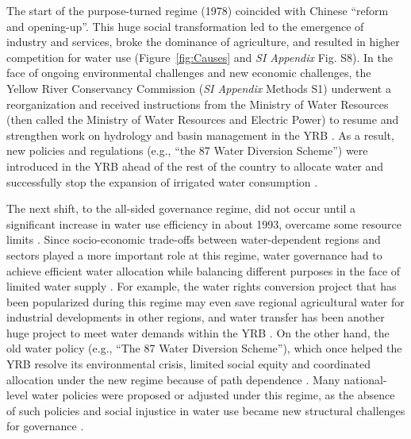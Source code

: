 \documentclass[9pt, twocolumn, twoside, lineno]{pnas-new}
\begin{document}
The start of the purpose-turned regime (1978) coincided with Chinese ``reform and opening-up''.
This huge social transformation led to the emergence of industry and services, broke the dominance of agriculture, and resulted in higher competition for water use (Figure~\ref{fig:Causes} and \textit{SI Appendix} Fig. S8). 
In the face of ongoing environmental challenges and new economic challenges, the Yellow River Conservancy Commission (\textit{SI Appendix} Methods S1) underwent a reorganization and received instructions from the Ministry of Water Resources (then called the Ministry of Water Resources and Electric Power) to resume and strengthen work on hydrology and basin management in the YRB 
\cite{yellowriverarchivesOrganizationalHistoryYellow2004}.
As a result, new policies and regulations (e.g., ``the 87 Water Diversion Scheme'') were introduced in the YRB ahead of the rest of the country to allocate water and successfully stop the expansion of irrigated water consumption 
\cite{wang2018}.

The next shift, to the all-sided governance regime, did not occur until a significant increase in water use efficiency in about 1993, overcame some resource limits  
\cite{liuWaterconservancyprojects2013}. 
Since socio-economic trade-offs between water-dependent regions and sectors played a more important role at this regime, water governance had to achieve efficient water allocation while balancing different purposes in the face of limited water supply  
\cite{dalin2015a}.
For example, the water rights conversion project that has been popularized during this regime may even save regional agricultural water for industrial developments in other regions, and water transfer has been another huge project to meet water demands within the YRB
\cite{barnett2015,yunpeng2010}.
On the other hand, the old water policy (e.g., ``The 87 Water Diversion Scheme''), which once helped the YRB resolve its environmental crisis, limited social equity and coordinated allocation under the new regime because of path dependence 
\cite{wang2018}.
Many national-level water policies were proposed or adjusted under this regime, as the absence of such policies and social injustice in water use became new structural challenges for governance
\cite{konar2019}.
\end{document}
